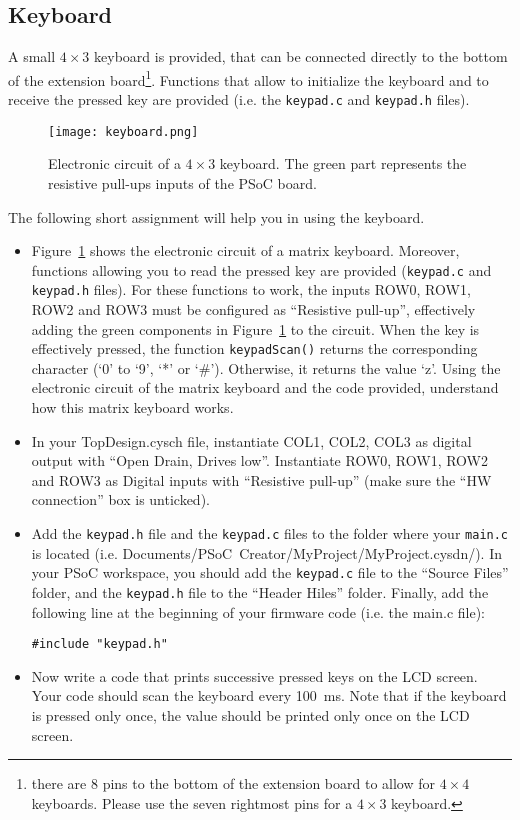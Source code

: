 \newpage
\subsection{Keyboard}

A small $4\times 3$ keyboard is provided, that can be connected directly to the bottom of the extension board\footnote{there are 8 pins to the bottom of the extension board to allow for $4\times 4$ keyboards. Please use the seven rightmost pins for a $4\times 3$ keyboard. }. Functions that allow to initialize the keyboard and to receive the pressed key are provided (i.e. the \texttt{keypad.c} and \texttt{keypad.h} files).  
\begin{figure}[h]
	\centering
	\texttt{[image: keyboard.png]}
	\caption{Electronic circuit of a $4\times 3$ keyboard. The green part represents the resistive pull-ups inputs of the PSoC board. }
	\label{fig:keyboard}
\end{figure}
The following short assignment will help you in using the keyboard. 
\begin{itemize}
	\item Figure~\ref{fig:keyboard} shows the electronic circuit of a matrix keyboard. Moreover, functions allowing you to read the pressed key are provided (\texttt{keypad.c} and \texttt{keypad.h} files). For these functions to work, the inputs ROW0, ROW1, ROW2 and ROW3 must be configured as ``Resistive pull-up'', effectively adding the green components in Figure~\ref{fig:keyboard} to the circuit. When the key is effectively pressed, the function \texttt{keypadScan()} returns the corresponding character (‘0’ to ‘9’, ‘*’ or ‘\#’).	Otherwise, it returns the value ‘z’. Using the electronic circuit of the matrix keyboard and the code provided, understand how this matrix keyboard works. 
	\item In your TopDesign.cysch file, instantiate COL1, COL2, COL3 as digital output with ``Open Drain, Drives low''. Instantiate ROW0, ROW1, ROW2 and ROW3 as Digital inputs with ``Resistive pull-up'' (make sure the ``HW connection'' box is unticked). 
	\item Add the \texttt{keypad.h} file and the \texttt{keypad.c} files to the folder where your \texttt{main.c} is located (i.e. Documents/PSoC~Creator/MyProject/MyProject.cysdn/). In your PSoC workspace, you should add the \texttt{keypad.c} file to the ``Source Files'' folder, and the  \texttt{keypad.h} file to the ``Header Hiles'' folder. Finally, add the following line at the beginning of your firmware code (i.e. the main.c file): 
\begin{lstlisting}[style=customc]
#include "keypad.h"	
\end{lstlisting}
	\item Now write a code that prints successive pressed keys on the LCD screen. Your code should scan the keyboard every 100~ms. Note that if the keyboard is pressed only once, the value should be printed only once on the LCD screen. 
\end{itemize}






